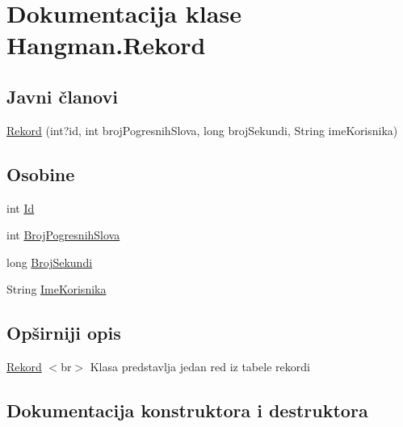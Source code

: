 \hypertarget{classHangman_1_1Rekord}{}\section{Dokumentacija klase Hangman.\+Rekord}
\label{classHangman_1_1Rekord}
\subsection*{Javni članovi}
\begin{DoxyCompactItemize}
\item 
\hyperlink{classHangman_1_1Rekord_a55aae169dd356e2b4809cb3372b550b1}{Rekord} (int?id, int broj\+Pogresnih\+Slova, long broj\+Sekundi, String ime\+Korisnika)
\end{DoxyCompactItemize}
\subsection*{Osobine}
\begin{DoxyCompactItemize}
\item 
int \hyperlink{classHangman_1_1Rekord_a80a64fd7b7b6c5f239d5a218c1eb3312}{Id}
\item 
int \hyperlink{classHangman_1_1Rekord_a12ef9615b02d723769c4d90f37b95985}{Broj\+Pogresnih\+Slova}
\item 
long \hyperlink{classHangman_1_1Rekord_a2789776fa83a4ee6c5ecc64e0856abef}{Broj\+Sekundi}
\item 
String \hyperlink{classHangman_1_1Rekord_a2f7bebc6fd9da6c2b32a783edcfb1e5b}{Ime\+Korisnika}
\end{DoxyCompactItemize}


\subsection{Opširniji opis}
\hyperlink{classHangman_1_1Rekord}{Rekord} $<$br$>$ Klasa predstavlja jedan red iz tabele rekordi 

\subsection{Dokumentacija konstruktora i destruktora}
\hypertarget{classHangman_1_1Rekord_a55aae169dd356e2b4809cb3372b550b1}{}
